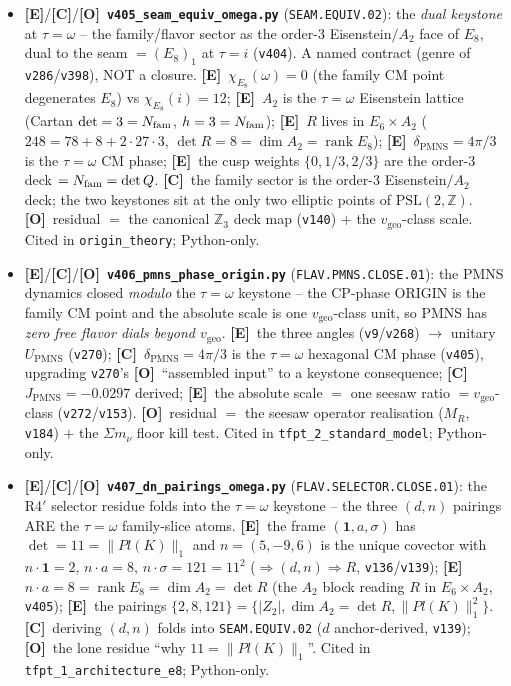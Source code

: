 \documentclass[11pt]{article}
\providecommand{\mE}{\textbf{[E]}}\providecommand{\mC}{\textbf{[C]}}
\providecommand{\mO}{\textbf{[O]}}\providecommand{\mX}{\textbf{[X]}}
\providecommand{\vref}[1]{\texttt{#1}}
\begin{document}
\begin{itemize}
\item \mE/\mC/\mO\ \textbf{\texttt{v405\_seam\_equiv\_omega.py}} (\texttt{SEAM.EQUIV.02}): the \emph{dual keystone} at $\tau{=}\omega$ -- the family/flavor sector as the order-$3$ Eisenstein$/A_2$ face of $E_8$, dual to the seam $=(E_8)_1$ at $\tau{=}i$ (\vref{v404}). A named contract (genre of \vref{v286}/\vref{v398}), NOT a closure. \mE\ $\chi_{E_8}(\omega)=0$ (the family CM point degenerates $E_8$) vs $\chi_{E_8}(i)=12$; \mE\ $A_2$ is the $\tau{=}\omega$ Eisenstein lattice (Cartan $\det=3=N_{\mathrm{fam}}$, $h=3=N_{\mathrm{fam}}$); \mE\ $R$ lives in $E_6{\times}A_2$ ($248=78+8+2{\cdot}27{\cdot}3$, $\det R=8=\dim A_2=\operatorname{rank}E_8$); \mE\ $\delta_{\mathrm{PMNS}}=4\pi/3$ is the $\tau{=}\omega$ CM phase; \mE\ the cusp weights $\{0,1/3,2/3\}$ are the order-$3$ deck $=N_{\mathrm{fam}}=\det Q$. \mC\ the family sector is the order-$3$ Eisenstein$/A_2$ deck; the two keystones sit at the only two elliptic points of $\mathrm{PSL}(2,\mathbb Z)$. \mO\ residual $=$ the canonical $\mathbb Z_3$ deck map (\vref{v140}) $+$ the $v_{\mathrm{geo}}$-class scale. Cited in \texttt{origin\_theory}; Python-only.
\item \mE/\mC/\mO\ \textbf{\texttt{v406\_pmns\_phase\_origin.py}} (\texttt{FLAV.PMNS.CLOSE.01}): the PMNS dynamics closed \emph{modulo} the $\tau{=}\omega$ keystone -- the CP-phase ORIGIN is the family CM point and the absolute scale is one $v_{\mathrm{geo}}$-class unit, so PMNS has \emph{zero free flavor dials beyond $v_{\mathrm{geo}}$}. \mE\ the three angles (\vref{v9}/\vref{v268}) $\to$ unitary $U_{\mathrm{PMNS}}$ (\vref{v270}); \mC\ $\delta_{\mathrm{PMNS}}=4\pi/3$ is the $\tau{=}\omega$ hexagonal CM phase (\vref{v405}), upgrading \vref{v270}'s \mO\ ``assembled input'' to a keystone consequence; \mC\ $J_{\mathrm{PMNS}}=-0.0297$ derived; \mE\ the absolute scale $=$ one seesaw ratio $=v_{\mathrm{geo}}$-class (\vref{v272}/\vref{v153}). \mO\ residual $=$ the seesaw operator realisation ($M_R$, \vref{v184}) $+$ the $\Sigma m_\nu$ floor kill test. Cited in \texttt{tfpt\_2\_standard\_model}; Python-only.
\item \mE/\mC/\mO\ \textbf{\texttt{v407\_dn\_pairings\_omega.py}} (\texttt{FLAV.SELECTOR.CLOSE.01}): the R4$'$ selector residue folds into the $\tau{=}\omega$ keystone -- the three $(d,n)$ pairings ARE the $\tau{=}\omega$ family-slice atoms. \mE\ the frame $(\mathbf 1,a,\sigma)$ has $\det=11=\|Pl(K)\|_1$ and $n=(5,-9,6)$ is the unique covector with $n{\cdot}\mathbf1=2$, $n{\cdot}a=8$, $n{\cdot}\sigma=121=11^2$ ($\Rightarrow(d,n)\Rightarrow R$, \vref{v136}/\vref{v139}); \mE\ $n{\cdot}a=8=\operatorname{rank}E_8=\dim A_2=\det R$ (the $A_2$ block reading $R$ in $E_6{\times}A_2$, \vref{v405}); \mE\ the pairings $\{2,8,121\}=\{|Z_2|,\dim A_2{=}\det R,\|Pl(K)\|_1^2\}$. \mC\ deriving $(d,n)$ folds into \texttt{SEAM.EQUIV.02} ($d$ anchor-derived, \vref{v139}); \mO\ the lone residue ``why $11{=}\|Pl(K)\|_1$''. Cited in \texttt{tfpt\_1\_architecture\_e8}; Python-only.
\end{itemize}
\end{document}
